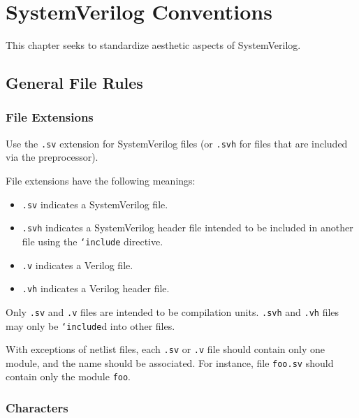 
\chapter{SystemVerilog Conventions}
\label{systemverilog_conventions}

  This chapter seeks to standardize aesthetic aspects of SystemVerilog.

  \section{General File Rules}
  \label{systemverilog_conventions:general_file_rules}

    \subsection{File Extensions}
    \label{systemverilog_conventions:general_file_rules:file_extensions}
      Use the \texttt{.sv} extension for SystemVerilog files (or \texttt{.svh} for files that are included via the preprocessor).

      File extensions have the following meanings:

      \begin{itemize}
      \item \texttt{.sv} indicates a SystemVerilog file.
      \item \texttt{.svh} indicates a SystemVerilog header file intended to be included in another file using the \texttt{`{}include} directive.
      \item \texttt{.v} indicates a Verilog file.
      \item \texttt{.vh} indicates a Verilog header file.
      \end{itemize}

      Only \texttt{.sv} and \texttt{.v} files are intended to be compilation units.
      \texttt{.svh} and \texttt{.vh} files may only be \texttt{`{}include}d into other files.

      With exceptions of netlist files, each \texttt{.sv} or \texttt{.v} file should contain only one module, and the name should be associated.
      For instance, file \texttt{foo.sv} should contain only the module \texttt{foo}.

    \subsection{Characters}
    \label{systemverilog_conventions:general_file_rules:characters}

